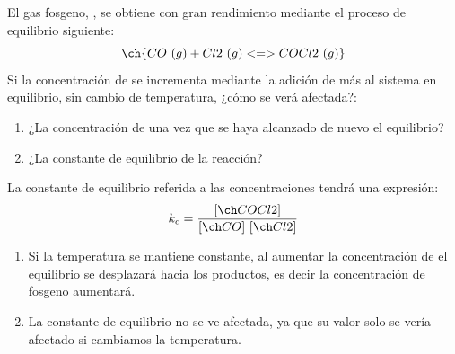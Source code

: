 \begin{exerciseEVAU}
    El gas fosgeno, , se obtiene con gran rendimiento mediante el proceso de equilibrio siguiente:
    \begin{equation*}
        \ch{CO\ (g) + Cl2\ (g) <=> COCl2\ (g)}
    \end{equation*}
    Si la concentración de  se incrementa mediante la adición de más  al sistema en equilibrio, sin cambio de temperatura, ¿cómo se verá afectada?:
    \begin{enumerate}[label=\letraminuscula]
\item ¿La concentración de  una vez que se haya alcanzado de nuevo el equilibrio?
\item ¿La constante de equilibrio de la reacción?
    \end{enumerate}

    \begin{solu}
        La constante de equilibrio referida a las concentraciones tendrá una expresión:
        \begin{equation*}
            k_c = \dfrac{\conc{COCl2}}{\conc{CO}\ \conc{Cl2}}
        \end{equation*}
        \begin{enumerate}[label=\letraminuscula]
\item Si la temperatura se mantiene constante, al aumentar la concentración de  el equilibrio se desplazará hacia los productos, es decir la concentración de fosgeno aumentará.
\item La constante de equilibrio no se ve afectada, ya que su valor solo se vería afectado si cambiamos la temperatura.
        \end{enumerate}
    \end{solu}

\end{exerciseEVAU}

